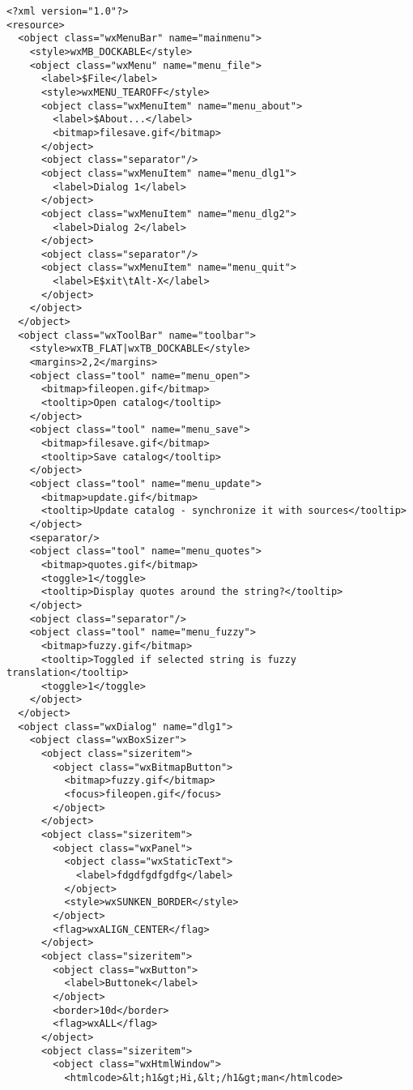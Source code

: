 \begin{verbatim}
<?xml version="1.0"?>
<resource>
  <object class="wxMenuBar" name="mainmenu">
    <style>wxMB_DOCKABLE</style>
    <object class="wxMenu" name="menu_file">
      <label>$File</label>
      <style>wxMENU_TEAROFF</style>
      <object class="wxMenuItem" name="menu_about">
        <label>$About...</label>
        <bitmap>filesave.gif</bitmap>
      </object>
      <object class="separator"/>
      <object class="wxMenuItem" name="menu_dlg1">
        <label>Dialog 1</label>
      </object>
      <object class="wxMenuItem" name="menu_dlg2">
        <label>Dialog 2</label>
      </object>
      <object class="separator"/>
      <object class="wxMenuItem" name="menu_quit">
        <label>E$xit\tAlt-X</label>
      </object>
    </object>
  </object>
  <object class="wxToolBar" name="toolbar">
    <style>wxTB_FLAT|wxTB_DOCKABLE</style>
    <margins>2,2</margins>
    <object class="tool" name="menu_open">
      <bitmap>fileopen.gif</bitmap>
      <tooltip>Open catalog</tooltip>
    </object>
    <object class="tool" name="menu_save">
      <bitmap>filesave.gif</bitmap>
      <tooltip>Save catalog</tooltip>
    </object>
    <object class="tool" name="menu_update">
      <bitmap>update.gif</bitmap>
      <tooltip>Update catalog - synchronize it with sources</tooltip>
    </object>
    <separator/>
    <object class="tool" name="menu_quotes">
      <bitmap>quotes.gif</bitmap>
      <toggle>1</toggle>
      <tooltip>Display quotes around the string?</tooltip>
    </object>
    <object class="separator"/>
    <object class="tool" name="menu_fuzzy">
      <bitmap>fuzzy.gif</bitmap>
      <tooltip>Toggled if selected string is fuzzy translation</tooltip>
      <toggle>1</toggle>
    </object>
  </object>
  <object class="wxDialog" name="dlg1">
    <object class="wxBoxSizer">
      <object class="sizeritem">
        <object class="wxBitmapButton">
          <bitmap>fuzzy.gif</bitmap>
          <focus>fileopen.gif</focus>
        </object>
      </object>
      <object class="sizeritem">
        <object class="wxPanel">
          <object class="wxStaticText">
            <label>fdgdfgdfgdfg</label>
          </object>
          <style>wxSUNKEN_BORDER</style>
        </object>
        <flag>wxALIGN_CENTER</flag>
      </object>
      <object class="sizeritem">
        <object class="wxButton">
          <label>Buttonek</label>
        </object>
        <border>10d</border>
        <flag>wxALL</flag>
      </object>
      <object class="sizeritem">
        <object class="wxHtmlWindow">
          <htmlcode>&lt;h1&gt;Hi,&lt;/h1&gt;man</htmlcode>

\end{verbatim}
